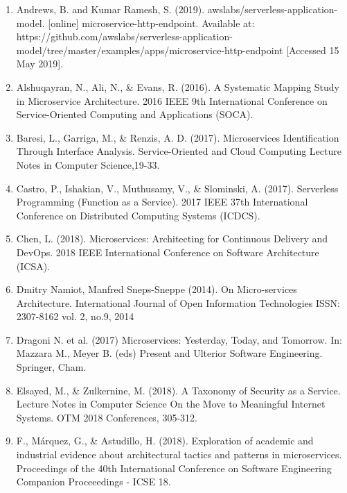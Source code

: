 \documentclass{article}
\begin{document}
\begin{enumerate}

\item Andrews, B. and Kumar Ramesh, S. (2019). awslabs/serverless-application-model. [online] microservice-http-endpoint. Available at: https://github.com/awslabs/serverless-application-model/tree/master/examples/apps/microservice-http-endpoint [Accessed 15 May 2019].


\item Alshuqayran, N., Ali, N., \& Evans, R. (2016). A Systematic Mapping Study in Microservice Architecture. 2016 IEEE 9th International Conference on Service-Oriented Computing and Applications (SOCA). 



\item Baresi, L., Garriga, M., \& Renzis, A. D. (2017). Microservices Identification Through Interface Analysis. Service-Oriented and Cloud Computing Lecture Notes in Computer Science,19-33.



\item Castro, P., Ishakian, V., Muthusamy, V., \& Slominski, A. (2017). Serverless Programming (Function as a Service). 2017 IEEE 37th International Conference on Distributed Computing Systems (ICDCS). 


\item Chen, L. (2018). Microservices: Architecting for Continuous Delivery and DevOps. 2018 IEEE International Conference on Software Architecture (ICSA). 


\item Dmitry Namiot, Manfred Sneps-Sneppe (2014). On Micro-services Architecture. International Journal of Open Information Technologies ISSN: 2307-8162 vol. 2, no.9, 2014


\item Dragoni N. et al. (2017) Microservices: Yesterday, Today, and Tomorrow. In: Mazzara M., Meyer B. (eds) Present and Ulterior Software Engineering. Springer, Cham.


\item Elsayed, M., \& Zulkernine, M. (2018). A Taxonomy of Security as a Service. Lecture Notes in Computer Science On the Move to Meaningful Internet Systems. OTM 2018 Conferences, 305-312. 


\item F., Márquez, G., \& Astudillo, H. (2018). Exploration of academic and industrial evidence about architectural tactics and patterns in microservices. Proceedings of the 40th International Conference on Software Engineering Companion Proceeedings - ICSE 18. 



\end{enumerate}
\end{document}
